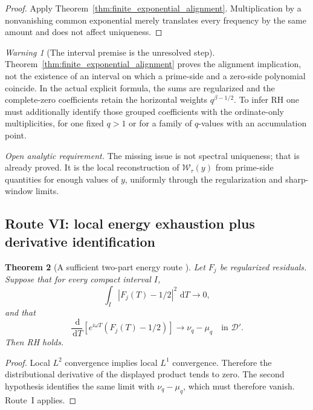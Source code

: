 \documentclass[11pt]{amsart}
\numberwithin{equation}{section}
\theoremstyle{plain}
\newtheorem{theorem}{Theorem}[section]
\theoremstyle{definition}
\theoremstyle{remark}
\newtheorem{warning}[theorem]{Warning}
\newcommand{\1}{\mathbf{1}}
\newcommand{\dd}{\,\mathrm{d}}
\begin{document}
\begin{proof}
Apply Theorem~\ref{thm:finite_exponential_alignment}.  Multiplication by a
nonvanishing common exponential merely translates every frequency by the
same amount and does not affect uniqueness.
\end{proof}

\begin{warning}[The interval premise is the unresolved step]
\label{warn:alignment_interval_premise}
Theorem~\ref{thm:finite_exponential_alignment} proves the alignment
implication, not the existence of an interval on which a prime-side and a
zero-side polynomial coincide.  In the actual explicit formula, the sums are
regularized and the complete-zero coefficients retain the horizontal weights
\(q^{\beta-1/2}\).  To infer RH one must additionally identify those grouped
coefficients with the ordinate-only multiplicities, for one fixed \(q>1\) or
for a family of \(q\)-values with an accumulation point.
\end{warning}

\medskip\noindent\emph{Open analytic requirement.} The missing issue is not spectral uniqueness; that is already
proved.  It is the local reconstruction of $\mathcal W_\tau(y)$ from
prime-side quantities for enough values of $y$, uniformly through the
regularization and sharp-window limits.

\subsection{Route VI: local energy exhaustion plus derivative identification}
\label{subsec:route_energy_local}


\begin{theorem}[A sufficient two-part energy route {}]
\label{thm:energy_local_route}
Let $F_j$ be regularized residuals.  Suppose that for every compact interval
$I$,
\begin{equation}
\int_I|F_j(T)-1/2|^2\,\dd T\longrightarrow0,
\label{eq:energy_route_local_L2}
\end{equation}
and that
\begin{equation}
\frac{\dd}{\dd T}
\left[e^{i\omega T}(F_j(T)-1/2)\right]
\longrightarrow
\nu_q-\mu_q
\quad\text{in }\mathcal D'.
\label{eq:energy_route_derivative}
\end{equation}
Then RH holds.
\end{theorem}

\begin{proof}
Local $L^2$ convergence implies local $L^1$ convergence.  Therefore the
distributional derivative of the displayed product tends to zero.  The
second hypothesis identifies the same limit with $\nu_q-\mu_q$, which must
therefore vanish.  Route~I applies.
\end{proof}
\end{document}
